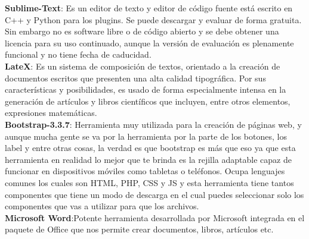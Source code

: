 \textbf{Sublime-Text}:  Es un editor de texto y editor de código fuente está escrito en C++ y Python para los plugins. Se puede descargar y evaluar de forma gratuita. Sin embargo no es software libre o de código abierto y se debe obtener una licencia para su uso continuado, aunque la versión de evaluación es plenamente funcional y no tiene fecha de caducidad.\\

\textbf{LateX}: Es un sistema de composición de textos, orientado a la creación de documentos escritos que presenten una alta calidad tipográfica. Por sus características y posibilidades, es usado de forma especialmente intensa en la generación de artículos y libros científicos que incluyen, entre otros elementos, expresiones matemáticas.\\

\textbf{Bootstrap-3.3.7}: Herramienta muy utilizada para la creación de páginas web, y aunque mucha gente se va por la herramienta por la parte de los botones, los label y entre otras cosas, la verdad es que bootstrap es más que eso ya que esta herramienta en realidad lo mejor que te brinda es la rejilla adaptable capaz de funcionar en dispositivos móviles como tabletas o teléfonos. Ocupa lenguajes comunes los cuales son HTML, PHP, CSS y JS y esta herramienta tiene tantos componentes que tiene un modo de descarga en el cual puedes seleccionar solo los componentes que vas a utilizar para que los archivos. \\

\textbf{Microsoft Word}:Potente herramienta desarrollada por Microsoft integrada en el paquete de Office que nos permite crear documentos, libros, artículos etc.\\
